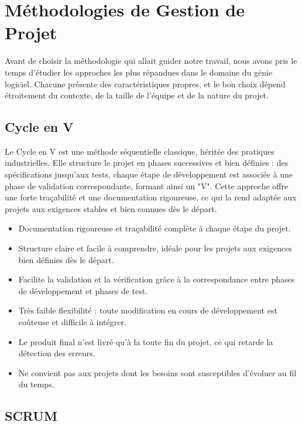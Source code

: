 \documentclass[12pt,a4paper]{report}
\begin{document}
	\section{Méthodologies de Gestion de Projet}
	
	Avant de choisir la méthodologie qui allait guider notre travail, nous avons pris le 
	temps d'étudier les approches les plus répandues dans le domaine du génie logiciel. 
	Chacune présente des caractéristiques propres, et le bon choix dépend étroitement 
	du contexte, de la taille de l'équipe et de la nature du projet.
	
	\subsection{Cycle en V}
	
	Le Cycle en V est une méthode séquentielle classique, héritée des pratiques 
	industrielles. Elle structure le projet en phases successives et bien définies : 
	des spécifications jusqu'aux tests, chaque étape de développement est associée 
	à une phase de validation correspondante, formant ainsi un "V". Cette approche 
	offre une forte traçabilité et une documentation rigoureuse, ce qui la rend adaptée 
	aux projets aux exigences stables et bien connues dès le départ.
	
	\begin{itemize}
		\item[\textcolor{green}{\textbf{+}}] Documentation rigoureuse et traçabilité 
		complète à chaque étape du projet.
		\item[\textcolor{green}{\textbf{+}}] Structure claire et facile à comprendre, 
		idéale pour les projets aux exigences bien définies dès le départ.
		\item[\textcolor{green}{\textbf{+}}] Facilite la validation et la vérification 
		grâce à la correspondance entre phases de développement et phases de test.
		\item[\textcolor{red}{\textbf{--}}] Très faible flexibilité : toute modification 
		en cours de développement est coûteuse et difficile à intégrer.
		\item[\textcolor{red}{\textbf{--}}] Le produit final n'est livré qu'à la toute 
		fin du projet, ce qui retarde la détection des erreurs.
		\item[\textcolor{red}{\textbf{--}}] Ne convient pas aux projets dont les besoins 
		sont susceptibles d'évoluer au fil du temps.
	\end{itemize}
	
	\subsection{SCRUM}
	
\end{document}
